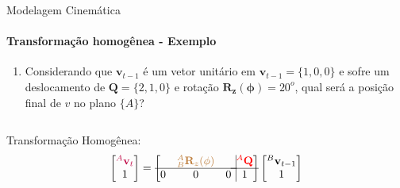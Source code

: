 \documentclass[aspectratio=169]{beamer}
\begin{document}
\begin{frame}{Modelagem Cinemática}
    \framesubtitle{Transformação homogênea - Exemplo}
    \begin{enumerate}
        \item Considerando que $\mathbf{v}_{t-1}$ é um vetor unitário em $\mathbf{v}_{t-1}=\{1,0,0\}$ e sofre um deslocamento de $\mathbf{Q}=\{2,1,0\}$ e rotação $\mathbf{R_z(\phi)}=20^o$, qual será a posição final de $v$ no plano $\{A\}$?
    \end{enumerate}
    \begin{columns}
        \begin{column}[c]{0.5\textwidth}
            
        \end{column}
        \begin{column}[c]{0.5\textwidth}
            
        \end{column}
    \end{columns}
    Transformação Homogênea:
    \begin{equation*}
        \begin{bmatrix}
            \color{purple}{{}^A \mathbf{v}_{t}} \\ 1
        \end{bmatrix}
        =
        \left[
            \begin{matrix}
                  & \color{brown}{{}_B^A\mathbf{R}_z(\phi)} &   \\ \hline
                0 & 0                                       & 0 \\
            \end{matrix} \right.
            \left.
            \vline
            \begin{matrix}
                \color{red}{{}^A\mathbf{Q}} \\ \hline
                1
            \end{matrix} \right]
        \begin{bmatrix}
            {}^B \mathbf{v}_{t-1} \\
            1
        \end{bmatrix}
    \end{equation*}
\end{frame}
\end{document}

